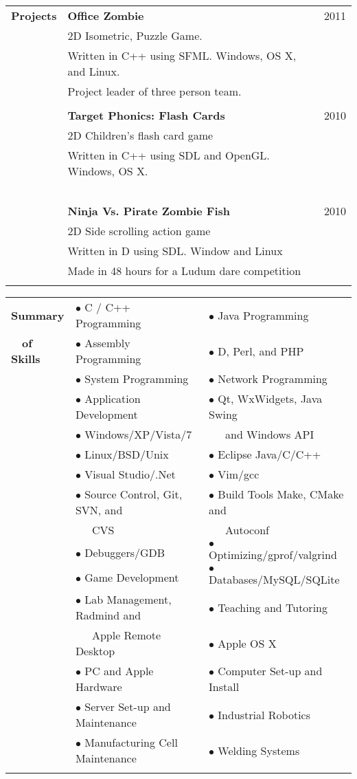 \documentclass[10pt,a4paper]{article}
\begin{document}
\begin{tabular}{  p{} p{} l }
\textbf{\large Projects} &  \textbf{Office Zombie} & 2011 \\
\ & 2D Isometric, Puzzle Game. & \ \\
\ & Written in C++ using SFML.  Windows, OS X, and Linux. & \ \\
\ & Project leader of three person team. & \ \\  
\\
\ & \textbf{Target Phonics: Flash Cards} & 2010 \\
\ & 2D Children's flash card game & \ \\
\ & Written in C++ using SDL and OpenGL.  Windows, OS X. & \ \\
\ & 
\\
\ & \textbf{Ninja Vs. Pirate Zombie Fish} & 2010 \\
\ & 2D Side scrolling action game & \ \\
\ & Written in D using SDL.  Window and Linux & \ \\
\ & Made in 48 hours for a Ludum dare competition & \ \\
\\
\end{tabular}

\begin{tabular}{ p{} p{} p{ }  }
\textbf{\large Summary} & $\bullet$ C / C++ Programming & $\bullet$ Java Programming \\
\ \ \textbf{\large of Skills} & $\bullet$ Assembly Programming & $\bullet$ D, Perl, and PHP \\
\ & $\bullet$ System Programming & $\bullet$ Network Programming\\
\ & $\bullet$ Application Development & 
 $\bullet$ Qt, WxWidgets, Java Swing \\
\ & $\bullet$ Windows/XP/Vista/7 & \ \ \ and Windows API  \\ 
\ & $\bullet$ Linux/BSD/Unix & $\bullet$ Eclipse Java/C/C++ \\
\ & $\bullet$ Visual Studio/.Net & $\bullet$ Vim/gcc \\
\ & $\bullet$ Source Control, Git, SVN, and & $\bullet$ Build Tools Make, CMake and \\
\ & \ \ \ CVS & \ \ \ Autoconf \\
\ & $\bullet$ Debuggers/GDB & $\bullet$ Optimizing/gprof/valgrind \\
\ & $\bullet$ Game Development & $\bullet$ Databases/MySQL/SQLite \\
\ & $\bullet$ Lab Management, Radmind and & $\bullet$ Teaching and Tutoring\\ \
\ & \ \ \ Apple Remote Desktop & $\bullet$ Apple OS X \\
\ & $\bullet$ PC and Apple Hardware & $\bullet$ Computer Set-up and Install \\
\ & $\bullet$ Server Set-up and Maintenance & $\bullet$ Industrial Robotics \\
\ & $\bullet$ Manufacturing Cell Maintenance & $\bullet$ Welding Systems\\
\\
\end{tabular}
\end{document}

